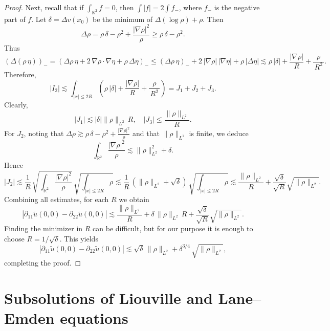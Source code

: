 \documentclass[11pt,a4paper]{article}
\numberwithin{equation}{section}
\theoremstyle{plain}
\theoremstyle{remark}
\newcommand {\f}{\frac}
\begin{document}
\begin{proof}
Next, recall that if $\int_{\mathbb{R}^2}f = 0$, then $\int |f| = 2\int f_{-}$, where $f_{-}$ is the negative part of $f$.  Let $\delta = \Delta v(x_{0})$ be the minimum of $\Delta(\log\rho)+\rho$. Then
\[
\Delta\rho
 = 
\rho\,\delta  - \rho^2 + \f{|\nabla\rho|^2}{\rho}
 \ge 
\rho\,\delta - \rho^2.
\]
Thus 
\[
\left(\Delta(\rho\,\eta)\right)_{-}
 = 
\left(\Delta\rho\,\eta + 2\,\nabla\rho\cdot\nabla\eta + \rho\,\Delta\eta\right)_{-}
 \le 
(\Delta\rho\,\eta)_{-}
 + 
2\,|\nabla\rho|\,|\nabla\eta|
 + 
\rho\,|\Delta\eta|
 \lesssim 
\rho\,|\delta|
 + 
\f{|\nabla\rho|}{\,R\,}
 + 
\f{\rho}{\,R^2\,}.
\]
Therefore,
\[
|I_2|
 \lesssim 
\int_{|x|\le 2R}
\!\left(\rho\,|\delta|
 + 
\f{|\nabla\rho|}{\,R\,}
 + 
\f{\rho}{\,R^2\,}\right)
 = 
J_1  +  J_2  +  J_3.
\]
Clearly,
\[
|J_1|
 \lesssim 
|\delta| \|\rho\|_{L^2}\,R,
\quad
|J_3|
 \le \f{\|\rho\|_{L^2}}{\,R\,}.
\]
For $J_2$, noting that $\Delta\rho \gtrsim \rho\,\delta - \rho^2 + \f{|\nabla\rho|^2}{\rho}$ 
and that $\|\rho\|_{L^1}$ is finite, we deduce
\[
\int_{\mathbb{R}^2}\f{|\nabla\rho|^2}{\,\rho\,}
 \lesssim \|\rho\|_{L^2}^2 + \delta.
\]
Hence
\[
|J_2|
 \lesssim 
\f{1}{R}
\,\sqrt{\int_{\mathbb{R}^2}\f{|\nabla\rho|^2}{\rho}}
\,\sqrt{\int_{|x|\le 2R}\rho}
 \lesssim 
\f{1}{R}\,\left(\|\rho\|_{L^2}+\sqrt{\delta}\right)
\,\sqrt{\int_{|x|\le 2R}\rho}
 \lesssim 
\f{\|\rho\|_{L^2}}{\,R\,}
 + 
\f{\sqrt{\delta}}{\sqrt{R}} \sqrt{\|\rho\|_{L^2}}.
\]
Combining all estimates, for each $R$ we obtain
\[
|\partial_{11}\tilde{u}(0,0)-\partial_{22}\tilde{u}(0,0)|
 \lesssim 
\f{\|\rho\|_{L^2}}{R}
 + \delta\,\|\rho\|_{L^2}\,R
 + \f{\sqrt{\delta}}{\sqrt{R}} \sqrt{\|\rho\|_{L^2}}.
\]
Finding the minimizer in $R$ can be difficult, but for our purpose it is enough to choose $R=1/\sqrt{\delta}$. This yields
\[
|\partial_{11}\tilde{u}(0,0)-\partial_{22}\tilde{u}(0,0)|
 \lesssim 
\sqrt{\delta}\,\|\rho\|_{L^2}
 + \delta^{3/4}\,\sqrt{\|\rho\|_{L^2}},
\]
completing the proof.
\end{proof}

\fi 




\section{Subsolutions of Liouville and Lane--Emden equations}\label{sec:liouville}
\end{document}
